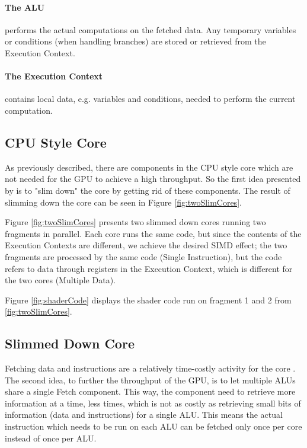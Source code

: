 \paragraph{The \gls{ALU}} performs the actual computations on the fetched data. Any temporary variables or conditions (when handling branches) are stored or retrieved from the Execution Context.

\paragraph{The Execution Context} contains local data, e.g. variables and conditions, needed to perform the current computation.

\subsection{\acs{CPU} Style Core}
As previously described, there are components in the \gls{CPU} style core which are not needed for the \gls{GPU} to achieve a high throughput.
So the first idea presented by \citet{intro_to_gpu_arch} is to "slim down" the core by getting rid of these components.
The result of slimming down the core can be seen in Figure \ref{fig:twoSlimCores}.



Figure \ref{fig:twoSlimCores} presents two slimmed down cores running two fragments in parallel. 
Each core runs the same code, but since the contents of the Execution Contexts are different, we achieve the desired \gls{SIMD} effect; the two fragments are processed by the same code (Single Instruction), but the code refers to data through registers in the Execution Context, which is different for the two cores (Multiple Data).

Figure \ref{fig:shaderCode} displays the shader code run on fragment 1 and 2 from \ref{fig:twoSlimCores}.

\subsection{Slimmed Down Core}
Fetching data and instructions are a relatively time-costly activity for the core .
The second idea, to further the throughput of the \gls{GPU}, is to let multiple \glspl{ALU} share a single Fetch component.
This way, the component need to retrieve more information at a time, less times, which is not as costly as retrieving small bits of information (data and instructions) for a single \gls{ALU}.
This means the actual instruction which needs to be run on each \gls{ALU} can be fetched only once per core instead of once per \gls{ALU}.

